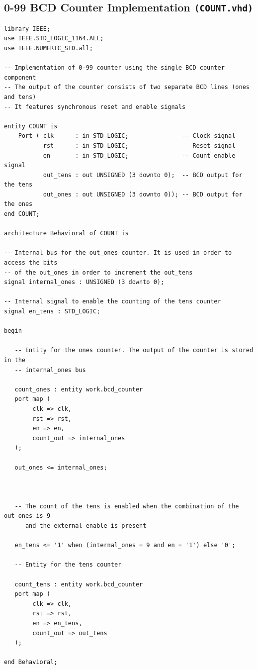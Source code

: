 \documentclass[10pt]{article}
\begin{document}
\subsection{0-99 BCD Counter Implementation \texttt{(COUNT.vhd)}}
\begin{verbatim}
library IEEE;
use IEEE.STD_LOGIC_1164.ALL;
use IEEE.NUMERIC_STD.all;

-- Implementation of 0-99 counter using the single BCD counter component
-- The output of the counter consists of two separate BCD lines (ones and tens)
-- It features synchronous reset and enable signals

entity COUNT is
    Port ( clk      : in STD_LOGIC;               -- Clock signal 
           rst      : in STD_LOGIC;               -- Reset signal
           en       : in STD_LOGIC;               -- Count enable signal
           out_tens : out UNSIGNED (3 downto 0);  -- BCD output for the tens
           out_ones : out UNSIGNED (3 downto 0)); -- BCD output for the ones
end COUNT;

architecture Behavioral of COUNT is

-- Internal bus for the out_ones counter. It is used in order to access the bits 
-- of the out_ones in order to increment the out_tens
signal internal_ones : UNSIGNED (3 downto 0);

-- Internal signal to enable the counting of the tens counter
signal en_tens : STD_LOGIC;

begin

   -- Entity for the ones counter. The output of the counter is stored in the 
   -- internal_ones bus
   
   count_ones : entity work.bcd_counter
   port map (
        clk => clk,
        rst => rst,
        en => en,
        count_out => internal_ones
   );
   
   out_ones <= internal_ones;
   
   
   
   -- The count of the tens is enabled when the combination of the out_ones is 9 
   -- and the external enable is present
   
   en_tens <= '1' when (internal_ones = 9 and en = '1') else '0';
   
   -- Entity for the tens counter
   
   count_tens : entity work.bcd_counter
   port map (
        clk => clk,
        rst => rst,
        en => en_tens,
        count_out => out_tens
   );
   
end Behavioral;
\end{verbatim}
\newpage
\end{document}
